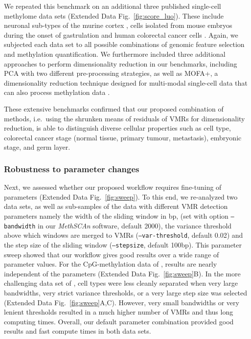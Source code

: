 \documentclass[10pt]{article}
\begin{document}
We repeated this benchmark on an additional three published single-cell methylome data sets (Extended Data Fig.~\ref{fig:score_luo}).
These include neuronal sub-types of the murine cortex \citep[][using cell type labels derived from CH-methylation in genomic tiles instead of CpG-methylation as ground truth]{luo2017single}, cells isolated from mouse embryos during the onset of gastrulation \citep[][using RNA-derived cell clusters or alternatively embryonic stage as ground truth]{argelaguet2019gastru} and human colorectal cancer cells \citep[][using sampling region as ground truth]{bian2018single}.
Again, we subjected each data set to all possible combinations of genomic feature selection and methylation quantification.
We furthermore included three additional approaches to perform dimensionality reduction in our benchmarks, including PCA with two different pre-processing strategies, as well as MOFA+, a dimensionality reduction technique designed for multi-modal single-cell data that can also process methylation data \citep{argelaguet2020mofa}.


These extensive benchmarks confirmed that our proposed combination of methods, i.e.\ using the shrunken means of residuals of VMRs for dimensionality reduction, is able to distinguish diverse cellular properties such as cell type, colorectal cancer stage (normal tissue, primary tumour, metastasis), embryonic stage, and germ layer.



\subsubsection*{Robustness to parameter changes}

Next, we assessed whether our proposed workflow requires fine-tuning of parameters (Extended Data Fig.~\ref{fig:sweep}).
To this end, we re-analyzed two data sets, as well as sub-samples of the data with different VMR detection parameters namely the width of the sliding window in bp, (set with option \texttt{--bandwidth} in our \textit{MethSCAn} software, default 2000), the variance threshold above which windows are merged to VMRs (\texttt{--var-threshold}, default 0.02) and the step size of the sliding window (\texttt{--stepsize}, default 100bp).
This parameter sweep showed that our workflow gives good results over a wide range of parameter values.
For the CpG-methylation data of \citet{luo2017single}, results are nearly independent of the parameters (Extended Data Fig.~\ref{fig:sweep}B).
In the more challenging data set of \citet{kremer_scnmt}, cell types were less cleanly separated when very large bandwidths, very strict variance thresholds, or a very large step size was selected (Extended Data Fig.~\ref{fig:sweep}A,C).
However, very small bandwidths or very lenient thresholds resulted in a much higher number of VMRs and thus long computing times.
Overall, our default parameter combination provided good results and fast compute times in both data sets.
\end{document}
